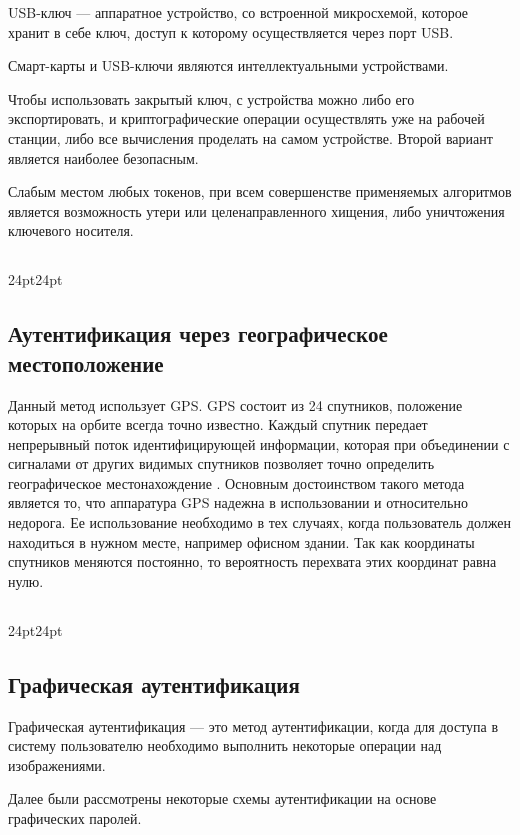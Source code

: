 USB-ключ \cite{bib2} --- аппаратное устройство, со встроенной микросхемой, которое хранит в себе ключ, доступ к которому осуществляется через порт USB. 

Смарт-карты и USB-ключи являются интеллектуальными устройствами.

Чтобы использовать закрытый ключ, с устройства можно либо его экспортировать, и криптографические операции осуществлять уже на рабочей станции, либо все вычисления проделать на самом устройстве. Второй вариант является наиболее безопасным.

Слабым местом любых токенов, при всем совершенстве применяемых алгоритмов является возможность утери или целенаправленного хищения, либо уничтожения ключевого носителя.

\titlespacing\subsection{\parindent}{24pt}{24pt}
\subsection{Аутентификация через географическое местоположение}
Данный метод использует GPS. GPS состоит из 24 спутников, положение которых на орбите всегда точно известно. Каждый спутник передает непрерывный поток идентифицирующей информации, которая при объединении с сигналами от других видимых спутников позволяет точно определить географическое местонахождение \cite{bib3}. 
Основным достоинством такого метода является то, что аппаратура GPS надежна в использовании и относительно недорога. Ее использование необходимо в тех случаях, когда пользователь должен находиться в нужном месте, например офисном здании. Так как координаты спутников меняются постоянно, то вероятность перехвата этих координат равна нулю. 

\titlespacing\subsection{\parindent}{24pt}{24pt}
\subsection{Графическая аутентификация}
Графическая аутентификация \cite{bib3} --- это метод аутентификации, когда для доступа в систему пользователю необходимо выполнить некоторые операции над изображениями. 

Далее были рассмотрены некоторые схемы аутентификации на основе графических паролей.

